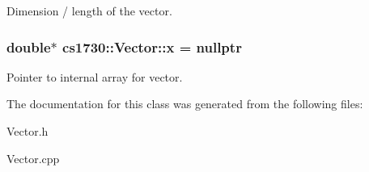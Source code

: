 Dimension / length of the vector. \hypertarget{classcs1730_1_1Vector_a6f173a4fcd1f5a72580166efd39fc252}{
\subsubsection[{x}]{\setlength{\rightskip}{0pt plus 5cm}double$\ast$ {\bf cs1730::Vector::x} = nullptr}}
\label{classcs1730_1_1Vector_a6f173a4fcd1f5a72580166efd39fc252}


Pointer to internal array for vector. 

The documentation for this class was generated from the following files:\begin{DoxyCompactItemize}
\item 
Vector.h\item 
Vector.cpp\end{DoxyCompactItemize}
